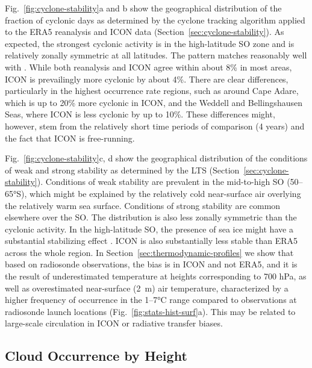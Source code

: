 \documentclass[draft]{agujournal2019}
\begin{document}
Fig.~\ref{fig:cyclone-stability}a and b show the geographical distribution of the fraction of cyclonic days as determined by the cyclone tracking algorithm applied to the ERA5 reanalysis and ICON data (Section~\ref{sec:cyclone-stability}). As expected, the strongest cyclonic activity is in the high-latitude SO zone and is relatively zonally symmetric at all latitudes. The pattern matches reasonably well with . While both reanalysis and ICON agree within about 8\% in most areas, ICON is prevailingly more cyclonic by about 4\%. There are clear differences, particularly in the highest occurrence rate regions, such as around Cape Adare, which is up to 20\% more cyclonic in ICON, and the Weddell and Bellingshausen Seas, where ICON is less cyclonic by up to 10\%. These differences might, however, stem from the relatively short time periods of comparison (4 years) and the fact that ICON is free-running.

Fig.~\ref{fig:cyclone-stability}c, d show the geographical distribution of the conditions of weak and strong stability as determined by the LTS (Section~\ref{sec:cyclone-stability}). Conditions of weak stability are prevalent in the mid-to-high SO (50–65°S), which might be explained by the relatively cold near-surface air overlying the relatively warm sea surface. Conditions of strong stability are common elsewhere over the SO. The distribution is also less zonally symmetric than the cyclonic activity. In the high-latitude SO, the presence of sea ice might have a substantial stabilizing effect \cite{knight2024}. ICON is also substantially less stable than ERA5 across the whole region. In Section~\ref{sec:thermodynamic-profiles} we show that based on radiosonde observations, the bias is in ICON and not ERA5, and it is the result of underestimated temperature at heights corresponding to 700 hPa, as well as overestimated near-surface (2~m) air temperature, characterized by a higher frequency of occurrence in the 1–7°C range compared to observations at radiosonde launch locations (Fig.~\ref{fig:stats-hist-surf}a). This may be related to large-scale circulation in ICON or radiative transfer biases.

\subsection{Cloud Occurrence by Height}
\label{sec:cloud-occurrence}
\end{document}
